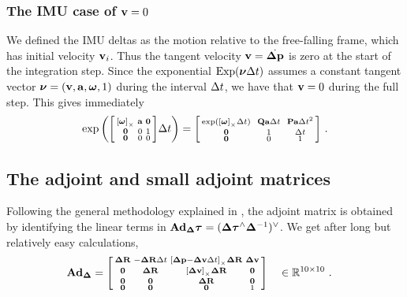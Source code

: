 \subsubsection{The IMU case of \texorpdfstring{${\bf v}=0$}{bfv=0}}
\label{sec:IMU_case}

We defined the IMU deltas as the motion relative to the free-falling frame, which has initial velocity ${\bf v}_i$. 
Thus the tangent velocity ${\bf v}=\dot{{\bm \Delta {\bf p}}}$  is zero at the start of the integration step. 
%
Since the exponential $\operatorname*{Exp}(\bm\nu\Delta t)$ assumes a constant tangent vector $\bm\nu=({\bf v},{\bf a},{{\bm \omega}},1)$ during the interval $\Delta t$, we have that ${\bf v}=0$ during the full step. 
%
This gives immediately
%
\begin{align}
\exp\left(\begin{bsmallmatrix}
\left[{{\bm \omega}}\right]_\times & {\bf a} & \bf0 \\
\bf0 & 0 & 1 \\
\bf0 & 0 & 0 
\end{bsmallmatrix}\Delta t\right) 
= \begin{bsmallmatrix}
\exp(\left[{{\bm \omega}}\right]_\times\Delta t) & ~{\bf Q}{\bf a}\Delta t~ & {\bf P}{\bf a}\Delta t^2 \\
\bf0 & 1 & \Delta t \\
\bf0 & 0 & 1
\end{bsmallmatrix}
~.
\end{align}




\subsection{The adjoint and small adjoint matrices}

%
Following the general methodology explained in \cite{sola2018micro}, the adjoint matrix is obtained by identifying the linear terms in ${\mathbf{Ad}_{{{\bm \Delta}}}}{\bm \tau}=({{\bm \Delta}}{\bm \tau}^\wedge{{\bm \Delta}}^{-1})^\vee$. We get after long but relatively easy calculations,
%
\begin{align}\label{equ:Ad}
{\mathbf{Ad}_{{{\bm \Delta}}}} &=
\begin{bsmallmatrix}
{\bm \Delta {\bf R}} & -{\bm \Delta {\bf R}}\Delta t & \left[{\bm \Delta {\bf p}}-{\bm \Delta {\bf v}}\Delta t\right]_\times{\bm \Delta {\bf R}} & {\bm \Delta {\bf v}} \\
\bf0 & {\bm \Delta {\bf R}} & \left[{\bm \Delta {\bf v}}\right]_\times{\bm \Delta {\bf R}} & \bf0 \\
\bf0 & \bf0 & {\bm \Delta {\bf R}} & \bf0 \\
\bf0 & \bf0 & \bf0 & 1
\end{bsmallmatrix} 
\quad
\in{\mathbb R}^{10\times10}~.
\end{align}




